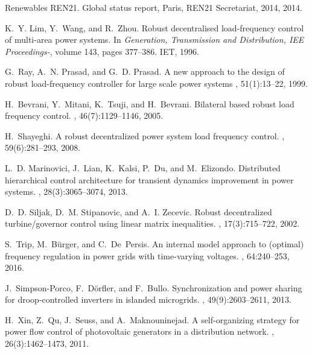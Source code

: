 \documentclass[journal]{IEEEtran}
\begin{document}
\begin{thebibliography}{10}

Renewables REN21.
\newblock Global status report, {P}aris, {REN}21 {S}ecretariat, 2014, 2014.

K.~Y. Lim, Y.~Wang, and R.~Zhou.
\newblock Robust decentralised load-frequency control of multi-area power
  systems.
\newblock In {\em Generation, Transmission and Distribution, IEE Proceedings-},
  volume 143, pages 377--386. IET, 1996.

G.~Ray, A.~N. Prasad, and G.~D. Prasad.
\newblock A new approach to the design of robust load-frequency controller for large scale power systems
,
  51(1):13--22, 1999.

H.~Bevrani, Y.~Mitani, K.~Tsuji, and H.~Bevrani.
\newblock Bilateral based robust load frequency control.
, 46(7):1129--1146, 2005.

H.~Shayeghi.
\newblock A robust decentralized power system load frequency control.
, 59(6):281--293, 2008.

L.~D. Marinovici, J.~Lian, K.~Kalsi, P.~Du, and M.~Elizondo.
\newblock Distributed hierarchical control architecture for transient dynamics improvement in power systems.
, 28(3):3065--3074, 2013.

D.~D. Siljak, D.~M. Stipanovic, and A.~I. Zecevic.
\newblock Robust decentralized turbine/governor control using linear matrix inequalities.
, 17(3):715--722, 2002.

S.~Trip, M.~B{\"u}rger, and C.~De~Persis.
\newblock An internal model approach to (optimal) frequency regulation in power
  grids with time-varying voltages.
, 64:240--253, 2016.

J.~Simpson-Porco, F.~D{\"o}rfler, and F.~Bullo.
\newblock Synchronization and power sharing for droop-controlled inverters in
  islanded microgrids.
, 49(9):2603--2611, 2013.

H.~Xin, Z.~Qu, J.~Seuss, and A.~Maknouninejad.
\newblock A self-organizing strategy for power flow control of photovoltaic
  generators in a distribution network.
, 26(3):1462--1473, 2011.


\end{thebibliography}
\end{document}
